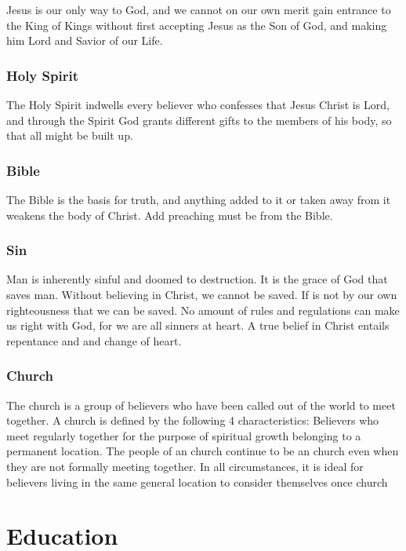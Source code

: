 \documentclass[CSHFoundation.tex]{subfiles}
\begin{document}
Jesus is our only way to God, and we cannot on our own merit gain entrance to the King of Kings without first accepting Jesus as the Son of God, and making him Lord and Savior of our Life.



\subsubsection{Holy Spirit}

The Holy Spirit indwells every believer who confesses that Jesus Christ is Lord, and through the Spirit God grants different gifts to the members of his body, so that all might be built up.



\subsubsection{Bible}

The Bible is the basis for truth, and anything added to it or taken away from it weakens the body of Christ. Add preaching must be from the Bible.



\subsubsection{Sin}

Man is inherently sinful and doomed to destruction. It is the grace of God that saves man. Without believing in Christ, we cannot be saved. If is not by our own righteousness that we can be saved. No amount of rules and regulations can make us right with God, for we are all sinners at heart. A true belief in Christ entails repentance and and change of heart.


\subsubsection{Church}

The church is a group of believers who have been called out of the world to meet together. A church is defined by the following 4 characteristics: Believers who meet regularly together for the purpose of spiritual growth belonging to a permanent location. The people of an church continue to be an church even when they are not formally meeting together. In all circumstances, it is ideal for believers living in the same general location to consider themselves once church


\section{Education}
\end{document}
